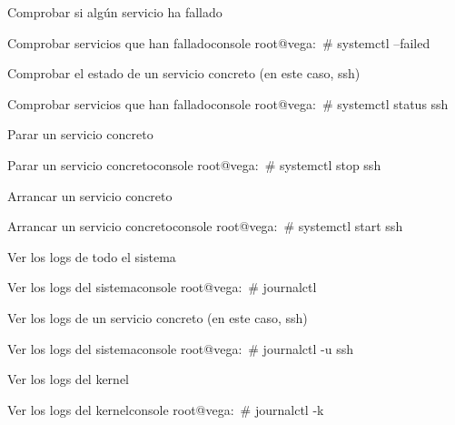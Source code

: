 Comprobar si algún servicio ha fallado
\begin{mycode}{Comprobar servicios que han fallado}{console}{}
root@vega:~# systemctl --failed
\end{mycode}

Comprobar el estado de un servicio concreto (en este caso, ssh)
\begin{mycode}{Comprobar servicios que han fallado}{console}{}
root@vega:~# systemctl status ssh
\end{mycode}

Parar un servicio concreto
\begin{mycode}{Parar un servicio concreto}{console}{}
root@vega:~# systemctl stop ssh
\end{mycode}

Arrancar un servicio concreto
\begin{mycode}{Arrancar un servicio concreto}{console}{}
root@vega:~# systemctl start ssh
\end{mycode}

Ver los logs de todo el sistema
\begin{mycode}{Ver los logs del sistema}{console}{}
root@vega:~# journalctl
\end{mycode}

Ver los logs de un servicio concreto (en este caso, ssh)
\begin{mycode}{Ver los logs del sistema}{console}{}
root@vega:~# journalctl -u ssh
\end{mycode}

Ver los logs del kernel
\begin{mycode}{Ver los logs del kernel}{console}{}
root@vega:~# journalctl -k
\end{mycode}